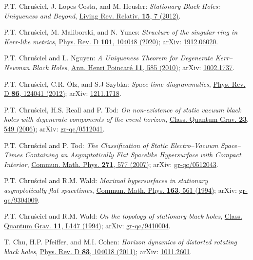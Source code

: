 \begin{thebibliography}{123}
P.T. Chru\'sciel, J. Lopes Costa, and M. Heusler:
{\em Stationary Black Holes: Uniqueness and Beyond},
\href{https://doi.org/10.12942/lrr-2012-7}{Living Rev. Relativ. {\bf 15}, 7 (2012)}.

P.T. Chru\'sciel, M. Maliborski, and N. Yunes:
{\em Structure of the singular ring in Kerr-like metrics},
\href{https://doi.org/10.1103/PhysRevD.101.104048}{Phys. Rev. D {\bf 101}, 104048 (2020)};
arXiv: \href{https://arxiv.org/abs/1912.06020}{1912.06020}.

P.T. Chru\'sciel and L. Nguyen:
{\em A Uniqueness Theorem for Degenerate Kerr–Newman Black Holes},
\href{https://doi.org/10.1007/s00023-010-0038-3}{Ann. Henri Poincaré {\bf 11}, 585 (2010)};
arXiv: \href{https://arxiv.org/abs/1002.1737}{1002.1737}.

P.T. Chru\'sciel, C.R. Ölz, and S.J Szybka:
{\em Space-time diagrammatics},
\href{https://doi.org/10.1103/PhysRevD.86.124041}{Phys. Rev. D {\bf 86}, 124041 (2012)};
arXiv: \href{https://arxiv.org/abs/1211.1718}{1211.1718}.

P.T. Chru\'sciel, H.S. Reall and P. Tod:
{\em On non-existence of static vacuum black holes with degenerate components of the event horizon},
\href{https://doi.org/10.1088/0264-9381/23/2/018}{Class. Quantum Grav. {\bf 23}, 549 (2006)};
arXiv: \href{https://arxiv.org/abs/gr-qc/0512041}{gr-qc/0512041}.

P.T. Chru\'sciel and P. Tod:
{\em The Classification of Static Electro–Vacuum Space–Times Containing an Asymptotically Flat Spacelike Hypersurface with Compact Interior},
\href{https://doi.org/10.1007/s00220-007-0191-9}{Commun. Math. Phys. {\bf 271}, 577 (2007)};
arXiv: \href{https://arxiv.org/abs/gr-qc/0512043}{gr-qc/0512043}.

P.T. Chru\'sciel and R.M. Wald:
{\em Maximal hypersurfaces in stationary asymptotically flat spacetimes},
\href{https://doi.org/10.1007/BF02101463}{Commun. Math. Phys. {\bf 163}, 561 (1994)};
arXiv: \href{https://arxiv.org/abs/gr-qc/9304009}{gr-qc/9304009}.

P.T. Chru\'sciel and R.M. Wald:
{\em On the topology of stationary black holes},
\href{https://doi.org/10.1088/0264-9381/11/12/001}{Class. Quantum Grav. {\bf 11}, L147 (1994)};
arXiv: \href{https://arxiv.org/abs/gr-qc/9410004}{gr-qc/9410004}.

T. Chu, H.P. Pfeiffer, and M.I. Cohen:
{\em Horizon dynamics of distorted rotating black holes},
\href{https://doi.org/10.1103/PhysRevD.83.104018}{Phys. Rev. D {\bf 83}, 104018 (2011)};
arXiv: \href{https://arxiv.org/abs/1011.2601}{1011.2601}.


\end{thebibliography}
